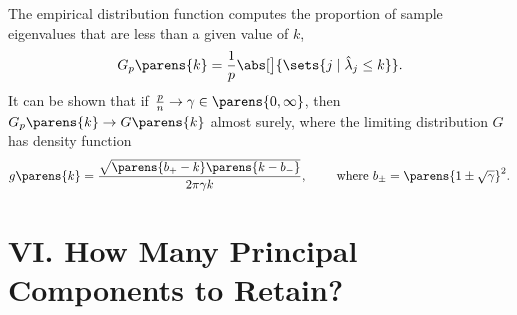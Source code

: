 \documentclass[12pt]{article}
\begin{document}
\begin{enumerate}[label=\textbf{\arabic*.}]
	The empirical distribution function computes the proportion of sample eigenvalues that are less than a given value of $k$, 
	\begin{align*}
		G_p \parens{k} = \frac{1}{p} \abs[\big]{\sets{j \mid \hat{\lambda}_j \le k}}. 
	\end{align*}
	It can be shown that if $\frac{p}{n} \to \gamma \in \parens{0, \infty}$, then $G_p \parens{k} \to G \parens{k}$ almost surely, where the limiting distribution $G$ has density function 
	\begin{align*}
		g \parens{k} = \frac{\sqrt{\parens{b_+ - k} \parens{k - b_-}}}{2 \pi \gamma k}, \qquad \text{ where } b_\pm = \parens{1 \pm \sqrt{\gamma}}^2. 
	\end{align*}

\end{enumerate}


\section*{VI. How Many Principal Components to Retain?} 
\end{document}
